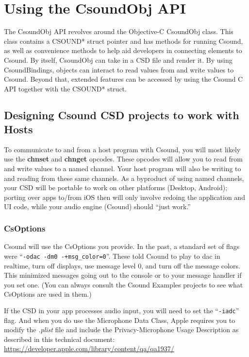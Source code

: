 \documentclass[11pt]{article}
\begin{document}
\section{Using the CsoundObj API}

The CsoundObj API revolves around the Objective-C CsoundObj class. This class contains a CSOUND* struct pointer and has methods for running Csound, as well as convenience methods to help aid developers in connecting elements to Csound. By itself, CsoundObj can take in a CSD file and render it.  By using CsoundBindings, objects can interact to read values from and write values to Csound.  Beyond that, extended features can be accessed by using the Csound C API together with the CSOUND* struct.

\subsection{Designing Csound CSD projects to work with Hosts}

To communicate to and from a host program with Csound, you will most likely use the \textbf{chnset} and \textbf{chnget} opcodes. These opcodes will allow you to read from and write values to a named channel.  Your host program will also be writing to and reading from these same channels.  As a byproduct of using named channels, your CSD will be portable to work on other platforms (Desktop, Android); porting over apps to/from iOS then will only involve redoing the application and UI code, while your audio engine (Csound) should ``just work.''

\subsubsection{CsOptions}

Csound will use the CsOptions you provide.  In the past, a standard set of flags were ``{\tt -odac -dm0 -+msg\_color=0}''. These told Csound to play to dac in realtime, turn off displays, use message level 0, and turn off the message colors.  This minimized messages going out to the console or to your message handler if you set one. (You can always consult the Csound Examples projects to see what CsOptions are used in them.)

If the CSD in your app processes audio input, you will need to set the ``{\tt -iadc}'' flag. And when you do use the Microphone Data Class, Apple requires you to modify the \textit{.plist} file and include the Privacy-Microphone Usage Description as described in this technical document: \url{https://developer.apple.com/library/content/qa/qa1937/}
\end{document}
